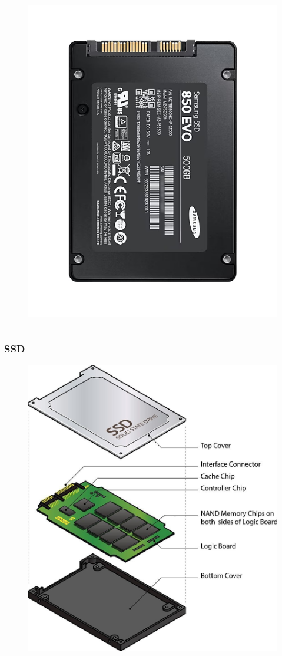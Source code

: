 \begin{frame}
\begin{columns}
		\begin{figure}[!htbp]
			\centering 
			\includegraphics[width=1.0\linewidth]{images/5_memory/ssd_info_2.png}
		\end{figure}
	\end{columns}
	
\end{frame}

\begin{frame}
	\frametitle{SSD}
	  
	\begin{figure}[!htbp]
		\centering 
		\includegraphics[width=0.55\linewidth]{images/5_memory/ssd_info_3.jpg}
		\label{fig:memory_ssd_info_0}
	\end{figure}
\end{frame}


